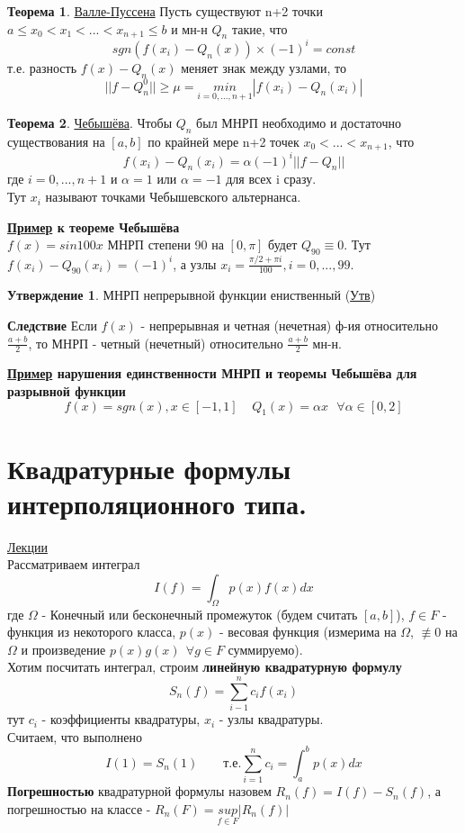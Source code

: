 \documentclass[specialist, subf, href, colorlinks=true, 12pt, times, mtpro, final]{disser}
\theoremstyle{definition}
\newtheorem{state}{Утверждение}[section]
\newtheorem{theorem}{Теорема}[section]
\begin{document}
	\begin{theorem}
		\hyperlink {lects.35}{Валле-Пуссена} Пусть существуют n+2 точки $a \le x_0 < x_1 < ... < x_{n+1} \le b$ и мн-н $Q_n$ такие, что 
		$$
			sgn(f(x_i) - Q_n(x)) \times (-1)^i = const
		$$
		т.е. разность $f(x) - Q_n(x)$ меняет знак между узлами, то
		$$
			||f-Q_n^0|| \ge \mu = \underset{i = 0, ..., n+1}{min} |f(x_i) - Q_n(x_i)|
		$$
	\end{theorem}
	\begin{theorem}
		\hyperlink {lects.35}{Чебышёва}. Чтобы $Q_n$ был МНРП необходимо и достаточно существования на $[a,b]$ по крайней мере n+2 точек $x_0 < ... < x_{n+1}$, что
		$$
			f(x_i) - Q_n(x_i) = \alpha (-1)^i ||f-Q_n||
		$$
		где $i = 0, ..., n+1$ и $\alpha = 1$ или $\alpha = -1$ для всех i сразу.\\
		Тут $x_i$ называют точками Чебышевского альтернанса.
	\end{theorem}

	\textbf{\hyperlink {lects.36}{Пример} к теореме Чебышёва}\\
	$f(x) = sin100x$ МНРП степени 90 на $[0,\pi]$ будет $Q_{90} \equiv 0$. Тут $f(x_i) - Q_{90}(x_i) = (-1)^i$, а узлы $x_i = \frac{\pi/2 +\pi i}{100}, i = 0, ... , 99$.
	
	\begin{state}
		МНРП непрерывной функции ениственный (\hyperlink {lects.36}{Утв})
	\end{state}
	\textbf{Следствие} Если $f(x)$ - непрерывная и четная (нечетная) ф-ия относительно $\frac{a+b}{2}$, то МНРП - четный (нечетный) относительно $\frac{a+b}{2}$ мн-н.
	
	\textbf{\hyperlink {lects.36}{Пример} нарушения единственности МНРП и теоремы Чебышёва для разрывной функции}
	$$
		f(x) = sgn(x), x\in[-1,1] \ \ \ \ \ Q_1(x) = \alpha x \ \ \ \forall \alpha \in [0,2] 
	$$
	

\section {Квадратурные формулы интерполяционного типа.}
	\hyperlink {lects.37}{Лекции}\\
	Рассматриваем интеграл
	$$
		I(f) = \int_{\Omega}p(x)f(x)dx
	$$
	где $\Omega$ - Конечный или бесконечный промежуток (будем считать $[a,b]$), $f \in F$ - функция из некоторого класса, $p(x)$ - весовая функция (измерима на $\Omega$, $\not\equiv 0$ на $\Omega$ и произведение $p(x)g(x) \ \ \forall g \in F$ суммируемо). \\
	Хотим посчитать интеграл, строим \textbf{линейную квадратурную формулу}
	$$
		S_n(f) = \sum\limits_{i - 1}^{n} c_if(x_i)
	$$
	тут $c_i$ - коэффициенты квадратуры, $x_i$ - узлы квадратуры.\\
	Считаем, что выполнено 
	$$
		I(1) = S_n(1) \ \ \ \ \ \ \ \ \ \text{т.е.} \sum\limits_{i = 1}^n c_i = \int_a^b p(x) dx
	$$
	\textbf{Погрешностью} квадратурной формулы назовем $R_n(f) = I(f) - S_n(f)$, а погрешностью на классе - $R_n(F) = \underset{f\in F}{sup} |R_n(f)|$
	
\end{document}
